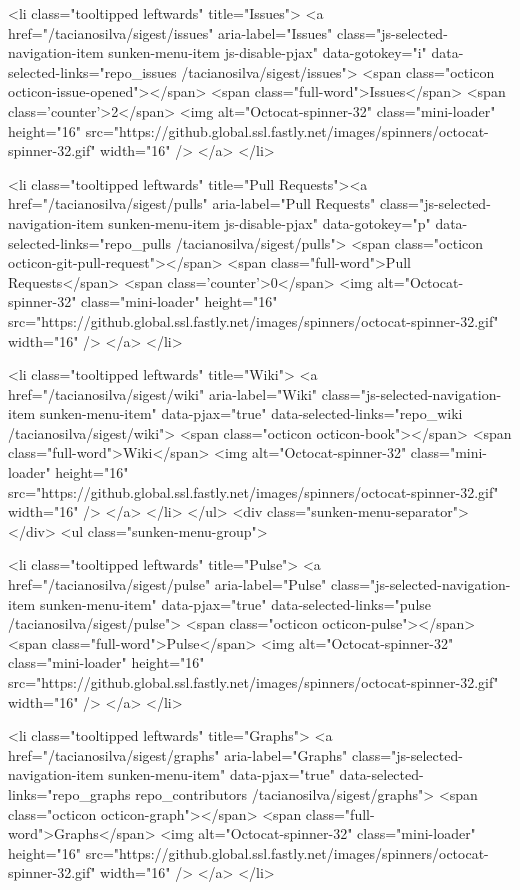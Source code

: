         <li class="tooltipped leftwards" title="Issues">
          <a href="/tacianosilva/sigest/issues" aria-label="Issues" class="js-selected-navigation-item sunken-menu-item js-disable-pjax" data-gotokey="i" data-selected-links="repo_issues /tacianosilva/sigest/issues">
            <span class="octicon octicon-issue-opened"></span> <span class="full-word">Issues</span>
            <span class='counter'>2</span>
            <img alt="Octocat-spinner-32" class="mini-loader" height="16" src="https://github.global.ssl.fastly.net/images/spinners/octocat-spinner-32.gif" width="16" />
</a>        </li>

      <li class="tooltipped leftwards" title="Pull Requests"><a href="/tacianosilva/sigest/pulls" aria-label="Pull Requests" class="js-selected-navigation-item sunken-menu-item js-disable-pjax" data-gotokey="p" data-selected-links="repo_pulls /tacianosilva/sigest/pulls">
            <span class="octicon octicon-git-pull-request"></span> <span class="full-word">Pull Requests</span>
            <span class='counter'>0</span>
            <img alt="Octocat-spinner-32" class="mini-loader" height="16" src="https://github.global.ssl.fastly.net/images/spinners/octocat-spinner-32.gif" width="16" />
</a>      </li>


        <li class="tooltipped leftwards" title="Wiki">
          <a href="/tacianosilva/sigest/wiki" aria-label="Wiki" class="js-selected-navigation-item sunken-menu-item" data-pjax="true" data-selected-links="repo_wiki /tacianosilva/sigest/wiki">
            <span class="octicon octicon-book"></span> <span class="full-word">Wiki</span>
            <img alt="Octocat-spinner-32" class="mini-loader" height="16" src="https://github.global.ssl.fastly.net/images/spinners/octocat-spinner-32.gif" width="16" />
</a>        </li>
    </ul>
    <div class="sunken-menu-separator"></div>
    <ul class="sunken-menu-group">

      <li class="tooltipped leftwards" title="Pulse">
        <a href="/tacianosilva/sigest/pulse" aria-label="Pulse" class="js-selected-navigation-item sunken-menu-item" data-pjax="true" data-selected-links="pulse /tacianosilva/sigest/pulse">
          <span class="octicon octicon-pulse"></span> <span class="full-word">Pulse</span>
          <img alt="Octocat-spinner-32" class="mini-loader" height="16" src="https://github.global.ssl.fastly.net/images/spinners/octocat-spinner-32.gif" width="16" />
</a>      </li>

      <li class="tooltipped leftwards" title="Graphs">
        <a href="/tacianosilva/sigest/graphs" aria-label="Graphs" class="js-selected-navigation-item sunken-menu-item" data-pjax="true" data-selected-links="repo_graphs repo_contributors /tacianosilva/sigest/graphs">
          <span class="octicon octicon-graph"></span> <span class="full-word">Graphs</span>
          <img alt="Octocat-spinner-32" class="mini-loader" height="16" src="https://github.global.ssl.fastly.net/images/spinners/octocat-spinner-32.gif" width="16" />
</a>      </li>

